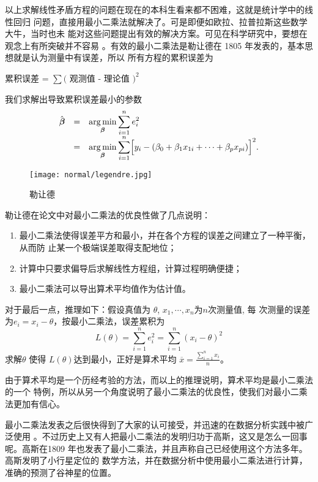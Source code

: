 以上求解线性矛盾方程的问题在现在的本科生看来都不困难，这就是统计学中的线性回归
问题，直接用最小二乘法就解决了。可是即便如欧拉、拉普拉斯这些数学大牛，当时也未
能对这些问题提出有效的解决方案。可见在科学研究中，要想在观念上有所突破并不容易
。有效的最小二乘法是勒让德在 1805 年发表的，基本思想就是认为测量中有误差，所以
所有方程的累积误差为
\begin{center}
累积误差 = $\sum($ 观测值 - 理论值 $)^2$
\end{center}
我们求解出导致累积误差最小的参数
\begin{eqnarray}
\label{least-square-error}
\begin{array}{lll}
\hat{\boldsymbol\beta}& = & \displaystyle \operatorname*{arg\,min}_{\boldsymbol {\beta}} \sum_{i=1}^n e_i^2 \\
           & = & \displaystyle
            \operatorname*{arg\,min}_{\boldsymbol\beta} \sum_{i=1}^n\Bigl[y_i - (\beta_0 + \beta_1x_{1i}
            + \cdots + \beta_px_{pi})\Bigr]^2 .
\end{array}
\end{eqnarray}

\begin{figure}[htbp]
\centering
\texttt{[image: normal/legendre.jpg]}
\caption{勒让德}
\end{figure}

勒让德在论文中对最小二乘法的优良性做了几点说明：
\begin{enumerate}
\item 最小二乘法使得误差平方和最小，并在各个方程的误差之间建立了一种平衡，从而防
      止某一个极端误差取得支配地位；
\item 计算中只要求偏导后求解线性方程组，计算过程明确便捷；
\item 最小二乘法可以导出算术平均值作为估计值。
\end{enumerate}
对于最后一点，推理如下：假设真值为 $\theta$, $x_1, \cdots, x_n$为$n$次测量值, 每
次测量的误差为$ e_i = x_i - \theta $，按最小二乘法，误差累积为
$$ L(\theta) = \sum_{i=1}^n e_i^2 = \sum_{i=1}^n (x_i - \theta)^2 $$
求解$\theta$ 使得 $L(\theta)$达到最小，正好是算术平均 $\overline{x} = \frac{\sum_{i=1}^n x_i}{n} $。

由于算术平均是一个历经考验的方法，而以上的推理说明，算术平均是最小二乘法的一个
特例，所以从另一个角度说明了最小二乘法的优良性，使我们对最小二乘法更加有信心。

最小二乘法发表之后很快得到了大家的认可接受，并迅速的在数据分析实践中被广泛使用
。不过历史上又有人把最小二乘法的发明归功于高斯，这又是怎么一回事呢。高斯在1809
年也发表了最小二乘法，并且声称自己已经使用这个方法多年。高斯发明了小行星定位的
数学方法，并在数据分析中使用最小二乘法进行计算，准确的预测了谷神星的位置。

